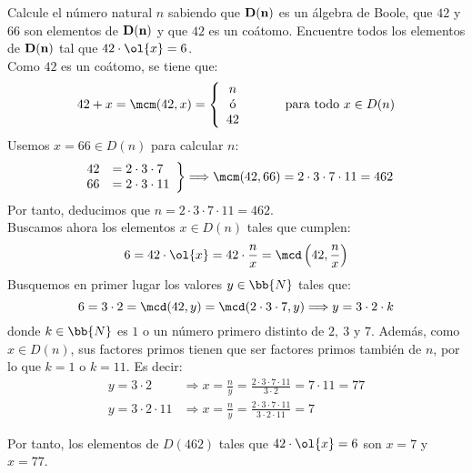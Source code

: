 \begin{ejercicio}
    Calcule el número natural $n$ sabiendo que $\bf{D}(n)$ es un álgebra de Boole,
    que $42$ y $66$ son elementos de $\bf{D}(n)$ y que $42$ es un coátomo.
    Encuentre todos los elementos de $\bf{D}(n)$ tal que $42\cdot \ol{x}=6$.\\

    Como $42$ es un coátomo, se tiene que:
    \begin{equation*}
        42 + x = \mcm(42,x) = \left\{
            \begin{array}{c}
                n \\
                \text{ó} \\
                42
            \end{array}
        \right.
        \hspace{1cm} \text{para todo } x\in D(n)
    \end{equation*}
    Usemos $x=66\in D(n)$ para calcular $n$:
    \begin{equation*}
        \left.
            \begin{array}{rl}
                42 &= 2\cdot 3\cdot 7\\
                66 &= 2\cdot 3\cdot 11
            \end{array}
        \right\} \Longrightarrow \mcm(42,66)=2\cdot 3\cdot 7\cdot 11=462
    \end{equation*}
    Por tanto, deducimos que $n=2\cdot 3\cdot 7\cdot 11=462$.\\
    
    Buscamos ahora los elementos $x\in D(n)$ tales que cumplen:
    \begin{equation*}
        6 = 42\cdot \ol{x} = 42\cdot \frac{n}{x} = \mcd\left(42,\frac{n}{x}\right)
    \end{equation*}
    Busquemos en primer lugar los valores $y\in \bb{N}$ tales que:
    \begin{equation*}
        6 = 3\cdot 2 = \mcd(42,y) = \mcd(2\cdot 3\cdot 7,y) \Longrightarrow
        y = 3\cdot 2 \cdot k
    \end{equation*}
    donde $k\in \bb{N}$ es $1$ o un número primero distinto de $2,~3$ y $7$. Además, como $x\in D(n)$,
    sus factores primos tienen que ser factores primos también de $n$, por lo que $k=1$ o $k=11$. Es decir:
    \begin{align*}
        y = 3\cdot 2 &\Longrightarrow x = \frac{n}{y} = \frac{2\cdot 3\cdot 7\cdot 11}{3\cdot 2} = 7\cdot 11 = 77\\
        y = 3\cdot 2\cdot 11 &\Longrightarrow x = \frac{n}{y} = \frac{2\cdot 3\cdot 7\cdot 11}{3\cdot 2\cdot 11} = 7
    \end{align*}

    Por tanto, los elementos de $D(462)$ tales que $42\cdot \ol{x}=6$ son $x=7$ y $x=77$.
\end{ejercicio}
